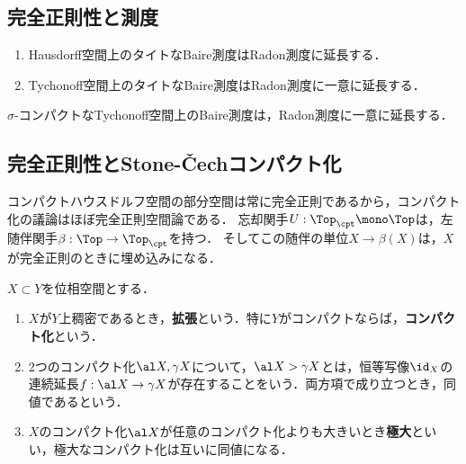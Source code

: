 \documentclass[uplatex,dvipdfmx]{jsreport}
\begin{document}
\subsection{完全正則性と測度}

\begin{lemma}\mbox{}
    \begin{enumerate}
        \item Hausdorff空間上のタイトなBaire測度はRadon測度に延長する．
        \item Tychonoff空間上のタイトなBaire測度はRadon測度に一意に延長する．
    \end{enumerate}
\end{lemma}

\begin{theorem}
    $\sigma$-コンパクトなTychonoff空間上のBaire測度は，Radon測度に一意に延長する．
\end{theorem}

\subsection{完全正則性とStone-Čechコンパクト化}

\begin{tcolorbox}[colframe=ForestGreen, colback=ForestGreen!10!white,breakable,colbacktitle=ForestGreen!40!white,coltitle=black,fonttitle=\bfseries\sffamily,
title=]
    コンパクトハウスドルフ空間の部分空間は常に完全正則であるから，コンパクト化の議論はほぼ完全正則空間論である．
    忘却関手$U:\Top_{\cpt}\mono\Top$は，左随伴関手$\beta:\Top\to\Top_\cpt$を持つ．
    そしてこの随伴の単位$X\to\beta (X)$は，$X$が完全正則のときに埋め込みになる．
\end{tcolorbox}

\begin{definition}[コンパクト化とその順序]
    $X\subset Y$を位相空間とする．
    \begin{enumerate}
        \item $X$が$Y$上稠密であるとき，\textbf{拡張}という．特に$Y$がコンパクトならば，\textbf{コンパクト化}という．
        \item 2つのコンパクト化$\al X,\gamma X$について，$\al X>\gamma X$とは，恒等写像$\id_X$の連続延長$f:\al X\to\gamma X$が存在することをいう．両方項で成り立つとき，同値であるという．
        \item $X$のコンパクト化$\al X$が任意のコンパクト化よりも大きいとき\textbf{極大}といい，極大なコンパクト化は互いに同値になる．
    \end{enumerate}
\end{definition}
\end{document}
